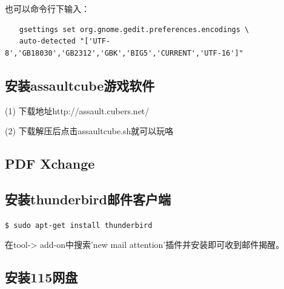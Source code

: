 也可以命令行下输入：
\begin{verbatim}
　　gsettings set org.gnome.gedit.preferences.encodings \ 
　　auto-detected "['UTF-8','GB18030','GB2312','GBK','BIG5','CURRENT','UTF-16']"
\end{verbatim}

\subsection{安装assaultcube游戏软件}
(1) 下载地址http://assault.cubers.net/

(2) 下载解压后点击assaultcube.sh就可以玩咯

\subsection{PDF Xchange}

\subsection{安装thunderbird邮件客户端}
\verb"$ sudo apt-get install thunderbird"

在tool-> add-on中搜索’new mail attention’插件并安装即可收到邮件揭醒。

\subsection{安装115网盘}
